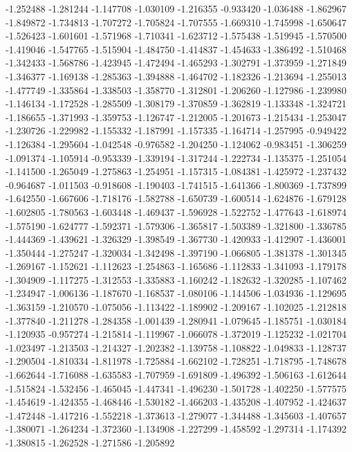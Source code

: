 -1.252488
-1.281244
-1.147708
-1.030109
-1.216355
-0.933420
-1.036488
-1.862967
-1.849872
-1.734813
-1.707272
-1.705824
-1.707555
-1.669310
-1.745998
-1.650647
-1.526423
-1.601601
-1.571968
-1.710341
-1.623712
-1.575438
-1.519945
-1.570500
-1.419046
-1.547765
-1.515904
-1.484750
-1.414837
-1.454633
-1.386492
-1.510468
-1.342433
-1.568786
-1.423945
-1.472494
-1.465293
-1.302791
-1.373959
-1.271849
-1.346377
-1.169138
-1.285363
-1.394888
-1.464702
-1.182326
-1.213694
-1.255013
-1.477749
-1.335864
-1.338503
-1.358770
-1.312801
-1.206260
-1.127986
-1.239980
-1.146134
-1.172528
-1.285509
-1.308179
-1.370859
-1.362819
-1.133348
-1.324721
-1.186655
-1.371993
-1.359753
-1.126747
-1.212005
-1.201673
-1.215434
-1.253047
-1.230726
-1.229982
-1.155332
-1.187991
-1.157335
-1.164714
-1.257995
-0.949422
-1.126384
-1.295604
-1.042548
-0.976582
-1.204250
-1.124062
-0.983451
-1.306259
-1.091374
-1.105914
-0.953339
-1.339194
-1.317244
-1.222734
-1.135375
-1.251054
-1.141500
-1.265049
-1.275863
-1.254951
-1.157315
-1.084381
-1.425972
-1.237432
-0.964687
-1.011503
-0.918608
-1.190403
-1.741515
-1.641366
-1.800369
-1.737899
-1.642550
-1.667606
-1.718176
-1.582788
-1.650739
-1.600514
-1.624876
-1.679128
-1.602805
-1.780563
-1.603448
-1.469437
-1.596928
-1.522752
-1.477643
-1.618974
-1.575190
-1.624777
-1.592371
-1.579306
-1.365817
-1.503389
-1.321800
-1.336785
-1.444369
-1.439621
-1.326329
-1.398549
-1.367730
-1.420933
-1.412907
-1.436001
-1.350444
-1.275247
-1.320034
-1.342498
-1.397190
-1.066805
-1.381378
-1.301345
-1.269167
-1.152621
-1.112623
-1.254863
-1.165686
-1.112833
-1.341093
-1.179178
-1.304909
-1.117275
-1.312553
-1.335883
-1.160242
-1.182632
-1.320285
-1.107462
-1.234947
-1.006136
-1.187670
-1.168537
-1.080106
-1.144506
-1.034936
-1.129695
-1.363159
-1.210570
-1.075056
-1.113422
-1.189902
-1.209167
-1.102025
-1.212818
-1.377840
-1.211278
-1.284358
-1.001439
-1.280941
-1.079645
-1.185751
-1.030184
-1.120935
-0.957274
-1.215814
-1.119967
-1.066078
-1.372019
-1.125232
-1.021704
-1.023497
-1.213503
-1.214327
-1.202382
-1.139758
-1.108822
-1.049833
-1.128737
-1.290504
-1.810334
-1.811978
-1.725884
-1.662102
-1.728251
-1.718795
-1.748678
-1.662644
-1.716088
-1.635583
-1.707959
-1.691809
-1.496392
-1.506163
-1.612644
-1.515824
-1.532456
-1.465045
-1.447341
-1.496230
-1.501728
-1.402250
-1.577575
-1.454619
-1.424355
-1.468446
-1.530182
-1.466203
-1.435208
-1.407952
-1.424637
-1.472448
-1.417216
-1.552218
-1.373613
-1.279077
-1.344488
-1.345603
-1.407657
-1.380071
-1.264234
-1.372360
-1.134908
-1.227299
-1.458592
-1.297314
-1.174392
-1.380815
-1.262528
-1.271586
-1.205892
